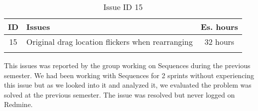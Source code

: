 \begin{longtable} { | c | p{12cm} | c | } 
\hline
	ID 	&	Issues	&		 Es. hours \\\hline
	15 	&	Original drag location flickers when rearranging	&	32 hours \\\hline
\caption{Issue ID 15}
\label{tab:spr2_flicker}
\end{longtable}

This issues was reported by the group working on Sequences during the previous semester. We had been working with Sequences for 2 sprints without experiencing this issue but as we looked into it and analyzed it, we evaluated the problem was solved at the previous semester. The issue was resolved but never logged on Redmine.